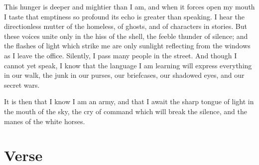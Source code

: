 \documentclass[english,11pt,letterpaper,onecolumn]{scrbook}
\begin{document}
	This hunger is deeper and mightier than I am, and when it forces open my mouth I taste that emptiness so profound its echo is greater than speaking.  I hear the directionless mutter of the homeless, of ghosts, and of characters in stories.  But these voices unite only in the hiss of the shell, the feeble thunder of silence; and the flashes of light which strike me are only sunlight reflecting from the windows as I leave the office.  Silently, I pass many people in the street.  And though I cannot yet speak, I know that the language I am learning will express everything in our walk, the junk in our purses, our briefcases, our shadowed eyes, and our secret wars.

	It is then that I know I am an army, and that I await the sharp tongue of light in the mouth of the sky, the cry of command which will break the silence, and the manes of the white horses.
	

\chapter{Verse}

\newpage
{}
\end{document}
